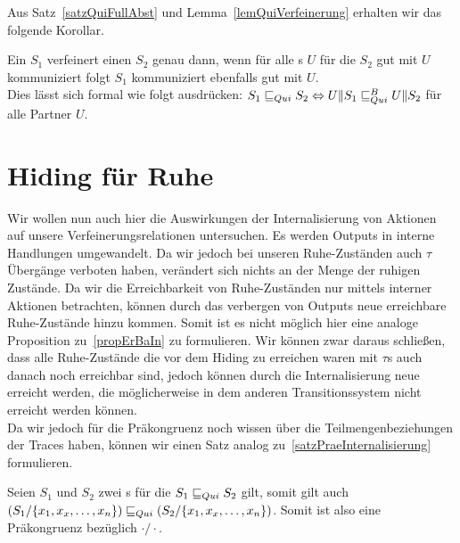 Aus Satz~\ref{satzQuiFullAbst} und Lemma~\ref{lemQuiVerfeinerung} erhalten wir
das folgende Korollar.

\begin{kor}
  Ein \EIO{} $S_1$ verfeinert einen \EIO{} $S_2$ genau dann, wenn für alle
  \EIO{}s $U$ für die $S_2$ gut mit $U$ kommuniziert folgt $S_1$ kommuniziert
  ebenfalls gut mit $U$.\\
  Dies lässt sich formal wie folgt ausdrücken: $S_1\sqsubseteq _{Qui} S_2\Leftrightarrow
  U\|S_1\sqsubseteq _{Qui}^B U\|S_2$ für alle Partner $U$.
\end{kor}

\section{Hiding für Ruhe}

Wir wollen nun auch hier die Auswirkungen der Internalisierung von Aktionen auf
unsere Verfeinerungsrelationen untersuchen. Es werden Outputs in interne
Handlungen umgewandelt. Da wir jedoch bei unseren Ruhe-Zuständen auch $\tau$
Übergänge verboten haben, verändert sich nichts an der Menge der ruhigen
Zustände. Da wir die Erreichbarkeit von Ruhe-Zuständen nur mittels interner
Aktionen betrachten, können durch das verbergen von Outputs neue erreichbare
Ruhe-Zustände hinzu kommen. Somit ist es nicht möglich hier eine analoge
Proposition zu~\ref{propErBaIn} zu formulieren. Wir können zwar daraus
schließen, dass alle Ruhe-Zustände die vor dem Hiding zu erreichen waren mit
$\tau$s auch danach noch erreichbar sind, jedoch können durch die
Internalisierung neue erreicht werden, die möglicherweise in dem anderen
Transitionssystem nicht erreicht werden können.\\
Da wir jedoch für die Präkongruenz \QRel{} noch wissen über die
Teilmengenbeziehungen der Traces haben, können wir einen Satz analog
zu~\ref{satzPraeInternalisierung} formulieren.

\begin{satz}
  \label{satzPraeInterQui}
  Seien $S_1$ und $S_2$ zwei \EIO{}s für die $S_1\sqsubseteq _{Qui} S_2$ gilt, somit gilt
  auch $(S_1/\{x_1,x_x,\dots ,x_n\})\sqsubseteq _{Qui} (S_2/\{x_1,x_x,\dots ,x_n\})$. Somit
  ist also \QRel{} eine Präkongruenz bezüglich $\cdot /\cdot$.
\end{satz}

